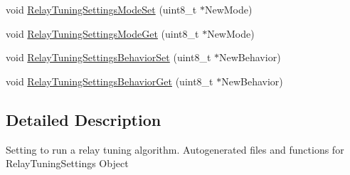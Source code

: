 \begin{DoxyCompactItemize}
\item 
void \hyperlink{group___relay_tuning_settings_gaead10c4b94e6e495ca6a81c5ca192b92}{\-Relay\-Tuning\-Settings\-Mode\-Set} (uint8\-\_\-t $\ast$\-New\-Mode)
\item 
void \hyperlink{group___relay_tuning_settings_gacb6a93e06d92770e12e28d163b81bf7a}{\-Relay\-Tuning\-Settings\-Mode\-Get} (uint8\-\_\-t $\ast$\-New\-Mode)
\item 
void \hyperlink{group___relay_tuning_settings_gafb8f8ad68344d8d9eb3b42a5680b2c77}{\-Relay\-Tuning\-Settings\-Behavior\-Set} (uint8\-\_\-t $\ast$\-New\-Behavior)
\item 
void \hyperlink{group___relay_tuning_settings_ga2ea778ade194a82e4c121d7ac6733e10}{\-Relay\-Tuning\-Settings\-Behavior\-Get} (uint8\-\_\-t $\ast$\-New\-Behavior)
\end{DoxyCompactItemize}


\subsection{\-Detailed \-Description}
\-Setting to run a relay tuning algorithm. \-Autogenerated files and functions for \-Relay\-Tuning\-Settings \-Object 

